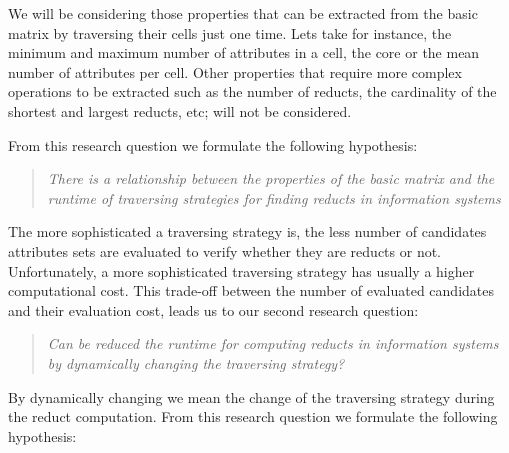 \documentclass[authoryear,11pt]{elsarticle}
\begin{document}
  We will be considering those properties that can be extracted from the basic matrix by traversing their 
  cells just one time. Lets take for instance, the minimum and maximum number of attributes in a cell, the 
  core or the mean number of attributes per cell. Other properties that require more complex operations to 
  be extracted such as the number of reducts, the cardinality of the shortest and largest reducts, etc; 
  will not be considered.
  
  From this research question we formulate the following hypothesis:
  
\begin{quote}  
  \emph{There is a relationship between the properties of the basic matrix and the runtime 
  		of traversing strategies for finding reducts in information systems}
\end{quote}
  		
%  
%
%    
  
  The more sophisticated a traversing strategy is, the less number of candidates attributes sets are 
  evaluated to verify whether they are reducts or not. Unfortunately, a more sophisticated traversing 
  strategy has usually a higher computational cost. This trade-off between the number of evaluated 
  candidates and their evaluation cost, leads us to our second research question:
  
\begin{quote}
  \emph{Can be reduced the runtime for computing reducts in information systems by 
  		dynamically changing the traversing strategy?}
\end{quote}
  By dynamically changing we mean the change of the traversing strategy during the reduct computation.
  From this research question we formulate the following hypothesis:
    
\end{document}
